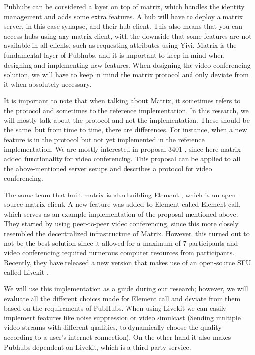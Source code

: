 \documentclass{report}
\begin{document}
Pubhubs can be considered a layer on top of matrix, which handles the identity management and adds some extra features.
A hub will have to deploy a matrix server, in this case synapse, and their hub client. This also means that you can
access hubs using any matrix client, with the downside that some features are not available in all clients, such as
requesting attributes using Yivi. Matrix is the fundamental layer of Pubhubs, and it is important to keep in mind
when designing and implementing new features. When designing the video conferencing solution, we will have to keep
in mind the matrix protocol and only deviate from it when absolutely necessary.

It is important to note that when talking about Matrix, it sometimes refers to the protocol and sometimes to the
reference implementation. In this research, we will mostly talk about the protocol and not the implementation. These
should be the same, but from time to time, there are differences. For instance, when a new feature is in the protocol
but not yet implemented in the reference implementation. We are mostly interested in proposal 3401 \cite{
noauthor_matrix-spec-proposalsproposals3401-group-voipmd_nodate}, since here matrix added functionality for video conferencing. This proposal
can be applied to all the above-mentioned server setups and describes a protocol for video conferencing.

The same team that built matrix is also building Element \cite{noauthor_element_nodate}, which is an open-source matrix client.
A new feature was added to Element called Element call, which serves as an example implementation of the proposal
mentioned above. They started by using peer-to-peer video conferencing, since this more closely resembled the
decentralized infrastructure of Matrix. However, this turned out to not be the best solution since it allowed for a
maximum of 7 participants and video conferencing required numerous computer  resources from participants. Recently,
they have released a new version that makes use of an open-source SFU called Livekit \cite{noauthor_livekit_nodate}.

We will use this implementation as a guide during our research; however, we will evaluate all the different choices
made for Element call and deviate from them based on the requirements of PubHubs. When using Livekit we can easily
implement features like noise suppression or video simulcast (Sending multiple video streams with different
qualities, to dynamically choose the quality according to a user's internet connection). On the other hand it
also makes Pubhubs dependent on Livekit, which is a third-party service.
\end{document}
